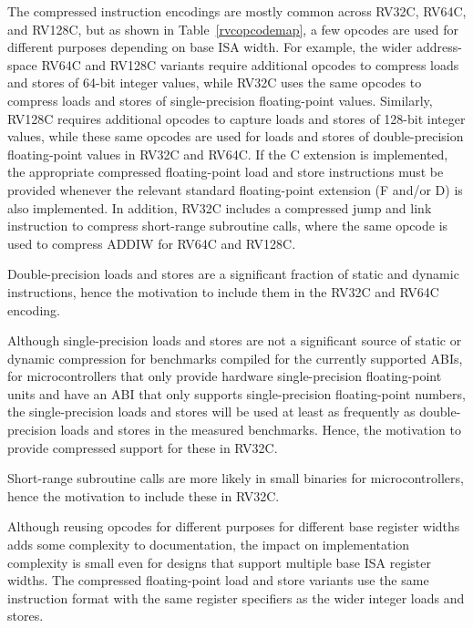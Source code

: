 The compressed instruction encodings are mostly common across RV32C,
RV64C, and RV128C, but as shown in Table~\ref{rvcopcodemap}, a few
opcodes are used for different purposes depending on base ISA width.
For example, the wider address-space RV64C and RV128C variants require
additional opcodes to compress loads and stores of 64-bit integer
values, while RV32C uses the same opcodes to compress loads and stores
of single-precision floating-point values.  Similarly, RV128C requires
additional opcodes to capture loads and stores of 128-bit integer
values, while these same opcodes are used for loads and stores of
double-precision floating-point values in RV32C and RV64C.  If the C
extension is implemented, the appropriate compressed floating-point
load and store instructions must be provided whenever the relevant
standard floating-point extension (F and/or D) is also implemented.
In addition, RV32C includes a compressed jump and link instruction to
compress short-range subroutine calls, where the same opcode is used
to compress ADDIW for RV64C and RV128C.

\begin{commentary}
Double-precision loads and stores are a significant fraction of static
and dynamic instructions, hence the motivation to include them in the
RV32C and RV64C encoding.

Although single-precision loads and stores are not a significant
source of static or dynamic compression for benchmarks compiled for
the currently supported ABIs, for microcontrollers that only provide
hardware single-precision floating-point units and have an ABI that
only supports single-precision floating-point numbers, the
single-precision loads and stores will be used at least as frequently
as double-precision loads and stores in the measured benchmarks.
Hence, the motivation to provide compressed support for these in
RV32C.

Short-range subroutine calls are more likely in small binaries for
microcontrollers, hence the motivation to include these in RV32C.

Although reusing opcodes for different purposes for different base
register widths adds some complexity to documentation, the impact on
implementation complexity is small even for designs that support
multiple base ISA register widths.  The compressed floating-point load
and store variants use the same instruction format with the same
register specifiers as the wider integer loads and stores.
\end{commentary}

